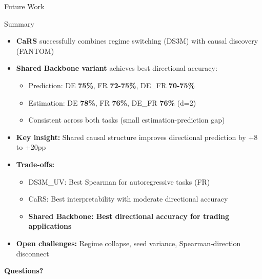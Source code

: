 \documentclass[aspectratio=169]{beamer}
\begin{document}
\begin{frame}{Future Work}
\vspace{0.3cm}
\begin{center}
\end{center}
\end{frame}

\begin{frame}{Summary}
\begin{itemize}
    \item \textbf{CaRS} successfully combines regime switching (DS3M) with causal discovery (FANTOM)

    \item \textbf{Shared Backbone variant} achieves best directional accuracy:
    \begin{itemize}
        \item Prediction: DE \textbf{75\%}, FR \textbf{72-75\%}, DE\_FR \textbf{70-75\%}
        \item Estimation: DE \textbf{78\%}, FR \textbf{76\%}, DE\_FR \textbf{76\%} (d=2)
        \item Consistent across both tasks (small estimation-prediction gap)
    \end{itemize}

    \item \textbf{Key insight:} Shared causal structure improves directional prediction by +8 to +20pp

    \item \textbf{Trade-offs:}
    \begin{itemize}
        \item DS3M\_UV: Best Spearman for autoregressive tasks (FR)
        \item CaRS: Best interpretability with moderate directional accuracy
        \item \textbf{Shared Backbone: Best directional accuracy for trading applications}
    \end{itemize}

    \item \textbf{Open challenges:} Regime collapse, seed variance, Spearman-direction disconnect
\end{itemize}

\vspace{0.3cm}
\begin{center}
\Large\textbf{Questions?}
\end{center}
\end{frame}
\end{document}
